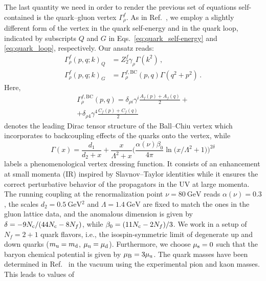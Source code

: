 \documentclass[%
    aps,
    prd,
    reprint,
    superscriptaddress,
    floatfix,
    nofootinbib,
    noamsmath,
    noamssymb
]{revtex4-2}
\newcommand*{\+}{\hspace*{.08335em}}
\newcommand*{\?}{\hspace*{-.08335em}}
\newcommand*{\Nc}{N_{\textup{c}}}
\newcommand*{\massu}{m_{\textup{u}}}
\newcommand*{\massd}{m_{\textup{d}}}
\newcommand*{\muu}{\mu_{\textup{u}}}
\newcommand*{\mud}{\mu_{\textup{d}}}
\newcommand*{\mus}{\mu_{\textup{s}}}
\newcommand*{\muB}{\mu_{\textup{B}}}
\begin{document}
The last quantity we need in order to render the previous set of equations
self-contained is the quark--gluon vertex $\Gamma_{\rho}^{f}$. As in
Ref.~\cite{Gunkel:2021oya}, we employ a slightly different form of the vertex in
the quark self-energy and in the quark loop, indicated by subscripts $Q$ and $G$
in Eqs.~\eqref{eq:quark_self-energy} and \eqref{eq:quark_loop}, respectively.
Our ansatz reads:
\begin{align}
    \Gamma^{f}_{\rho}(p,q;k)_{Q}
    &=
    Z_{2}^{f} \gamma_{\rho} \Gamma(k^{2})
    \,,
    \\[.25em]
    \Gamma^{f}_{\rho}(p,q;k)_{G}
    &=
    \Gamma^{f, \text{BC}}_{\rho}(p,q)
    \Gamma(q^{2} + p^{2})
    \,.
\end{align}
Here,
\begin{multline}
    \Gamma^{f, \text{BC}}_{\rho}(p,q)
    =
    \delta_{\rho i}
    \gamma^{i}
    \frac{A_{f}(p) + A_{f}(q)}{2}
    +
    \\
    +
    \delta_{\rho 4}
    \gamma^{4}
    \frac{C_{f}(p) + C_{f}(q)}{2}
\end{multline}
denotes the leading Dirac tensor structure of the Ball--Chiu vertex
\cite{Ball:1980ay} which incorporates to backcoupling effects of the quarks onto
the vertex, while
\begin{equation}
    \Gamma(x)
    =
    \frac{d_{1}}{d_{2} + x}
    +
    \frac{x}{\Lambda^{2} + x}
    \biggl(
        \frac{\alpha(\nu) \beta_{0}}{4 \pi}
        \ln\bigl(
            x / \Lambda^{2} + 1
        \bigr)
    \biggr)^{2 \delta}
\end{equation}
labels a phenomenological vertex dressing function. It consists of an
enhancement at small momenta (IR) inspired by Slavnov--Taylor identities while
it ensures the correct perturbative behavior of the propagators in the UV at
large momenta. The running coupling at the renormalization point
$\nu=\SI{80}{\GeV}$ reads $\alpha(\nu) = 0.3$, the scales $d_{2} =
\SI{0.5}{\GeV^{2}}$ and $\Lambda = \SI{1.4}{\GeV}$ are fixed to match the ones
in the gluon lattice data, and the anomalous dimension is given by $\delta = -9
\Nc / (44\Nc - 8 N_{f})$, while $\beta_{0} = (11 \Nc - 2 N_{f}) / 3$. We work in
a setup of $N_f=2+1$ quark flavors, i.e., the isospin-symmetric limit of
degenerate up and down quarks ($\massu = \massd$, $\muu = \mud$). Furthermore,
we choose $\mus = 0$ such that the baryon chemical potential is given by $\muB =
3 \muu$. The quark masses have been determined in Ref.~\cite{Gunkel:2019xnh} in
the vacuum using the experimental pion and kaon masses. This leads to values of
\end{document}

